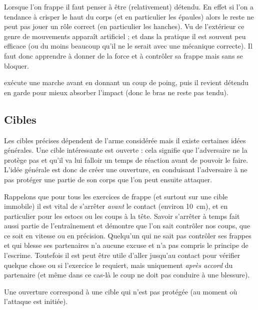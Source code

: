 Lorsque l'on frappe il faut penser à être (relativement) détendu.
En effet si l'on a tendance à crisper le haut du corps (et en particulier les épaules) alors le reste ne peut pas jouer un rôle correct (en particulier les hanches).
Vu de l'extérieur ce genre de mouvements apparaît artificiel ; et dans la pratique il est souvent peu efficace (ou du moins beaucoup qu'il ne le serait avec une mécanique correcte).
Il faut donc apprendre à donner de la force et à contrôler sa frappe mais sans se bloquer.


\begin{exercice}
\label{att:ex:marche-poing-détendu}

\A exécute une marche avant en donnant un coup de poing, puis il revient détendu en garde pour mieux absorber l'impact (donc le bras ne reste pas tendu).
\end{exercice}



\subsection{Cibles}


Les cibles précises dépendent de l'arme considérée mais il existe certaines idées générales.
Une cible intéressante est ouverte : cela signifie que l'adversaire ne la protège pas et qu'il va lui falloir un temps de réaction avant de pouvoir le faire.
L'idée générale est donc de créer une ouverture, en conduisant l'adversaire à ne pas protéger une partie de son corps que l'on peut ensuite attaquer.

Rappelons que pour tous les exercices de frappe (et surtout sur une cible immobile) il est vital de s'arrêter \emph{avant} le contact (environ \SI{10}{cm}), et en particulier pour les estocs ou les coups à la tête.
Savoir s'arrêter à temps fait aussi partie de l'entraînement et démontre que l'on sait contrôler nos coups, que ce soit en vitesse ou en précision.
Quelqu'un qui ne sait pas contrôler ses frappes et qui blesse ses partenaires n'a aucune excuse et n'a pas compris le principe de l'escrime.
Toutefois il est peut être utile d'aller jusqu'au contact pour vérifier quelque chose ou si l'exercice le requiert, mais uniquement \emph{après accord} du partenaire (et même dans ce cas-là le coup ne doit pas conduire à une blessure).


\begin{definition}[Ouverture]

Une ouverture correspond à une cible qui n'est pas protégée (au moment où l'attaque est initiée).
\end{definition}


